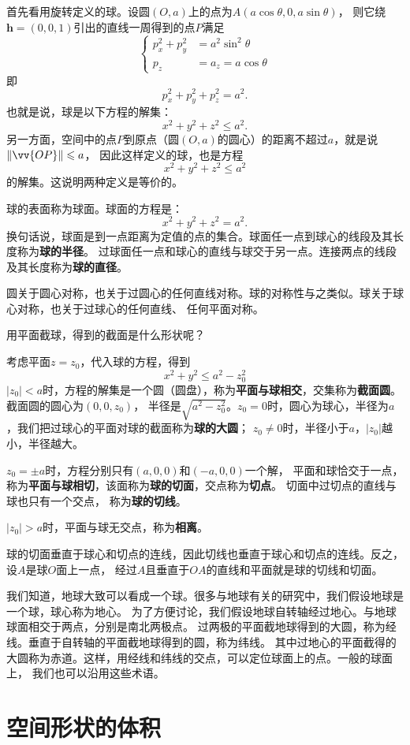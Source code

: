 \documentclass[12pt,UTF8]{ctexbook}
\begin{document}
首先看用旋转定义的球。设圆$(O,a)$上的点为$A(a\cos{\theta}, 0, a\sin{\theta})$，
则它绕$\mathbf{h} = (0,0,1)$引出的直线一周得到的点$P$满足
$$
\left\{
\begin{array}{rl}
p_x^2+p_y^2 &= a^2\sin^2{\theta} \\
p_z &= a_z = a\cos{\theta}
\end{array}
\right.
$$
即
$$ p_x^2 + p_y^2 + p_z^2 = a^2.$$
也就是说，球是以下方程的解集：
$$ x^2 + y^2 + z^2 \leqslant a^2.$$
另一方面，空间中的点$P$到原点（圆$(O,a)$的圆心）的距离不超过$a$，就是说$\|\vv{OP}\| \leqslant a$​，
因此这样定义的球，也是方程
$$ x^2 + y^2 + z^2 \leqslant a^2$$
的解集。这说明两种定义是等价的。

球的表面称为球面。球面的方程是：
$$ x^2 + y^2 + z^2 = a^2.$$
换句话说，球面是到一点距离为定值的点的集合。球面任一点到球心的线段及其长度称为\textbf{球的半径}。
过球面任一点和球心的直线与球交于另一点。连接两点的线段及其长度称为\textbf{球的直径}。

圆关于圆心对称，也关于过圆心的任何直线对称。球的对称性与之类似。球关于球心对称，也关于过球心的任何直线、
任何平面对称。

用平面截球，得到的截面是什么形状呢？

考虑平面$z=z_0$，代入球的方程，得到
$$ x^2 + y^2 \leqslant a^2-z_0^2 $$
$|z_0|<a$时，方程的解集是一个圆（圆盘），称为\textbf{平面与球相交}，交集称为\textbf{截面圆}。截面圆的圆心为$(0,0,z_0)$，
半径是$\sqrt{a^2-z_0^2}$。$z_0=0$时，圆心为球心，半径为$a$，我们把过球心的平面对球的截面称为\textbf{球的大圆}；
$z_0\neq 0$时，半径小于$a$，$|z_0|$越小，半径越大。

$z_0=\pm a$时，方程分别只有$(a,0,0)$和$(-a,0,0)$一个解，
平面和球恰交于一点，称为\textbf{平面与球相切}，该面称为\textbf{球的切面}，交点称为\textbf{切点}。
切面中过切点的直线与球也只有一个交点，
称为\textbf{球的切线}。

$|z_0|>a$时，平面与球无交点，称为\textbf{相离}。

球的切面垂直于球心和切点的连线，因此切线也垂直于球心和切点的连线。反之，设$A$是球$O$面上一点，
经过$A$且垂直于$OA$的直线和平面就是球的切线和切面。

我们知道，地球大致可以看成一个球。很多与地球有关的研究中，我们假设地球是一个球，球心称为地心。
为了方便讨论，我们假设地球自转轴经过地心。与地球球面相交于两点，分别是南北两极点。
过两极的平面截地球得到的大圆，称为经线。垂直于自转轴的平面截地球得到的圆，称为纬线。
其中过地心的平面截得的大圆称为赤道。这样，用经线和纬线的交点，可以定位球面上的点。一般的球面上，
我们也可以沿用这些术语。

\chapter{空间形状的体积}
\end{document}
